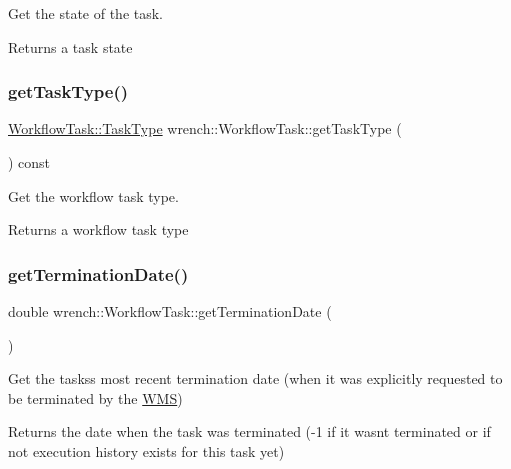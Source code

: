 Get the state of the task. 

\begin{DoxyReturn}{Returns}
a task state 
\end{DoxyReturn}
\mbox{\label{classwrench_1_1_workflow_task_ac9ad03bc492dd9a827c43e13e079e08c}} 
\subsubsection{\texorpdfstring{get\+Task\+Type()}{getTaskType()}}
{\footnotesize\ttfamily \hyperlink{classwrench_1_1_workflow_task_a490a935259b9425a3e4fb011a86cb4bf}{Workflow\+Task\+::\+Task\+Type} wrench\+::\+Workflow\+Task\+::get\+Task\+Type (\begin{DoxyParamCaption}{ }\end{DoxyParamCaption}) const}



Get the workflow task type. 

\begin{DoxyReturn}{Returns}
a workflow task type 
\end{DoxyReturn}
\mbox{\label{classwrench_1_1_workflow_task_a864c86e8bb6de6ab16106169ec0a2cc2}} 
\subsubsection{\texorpdfstring{get\+Termination\+Date()}{getTerminationDate()}}
{\footnotesize\ttfamily double wrench\+::\+Workflow\+Task\+::get\+Termination\+Date (\begin{DoxyParamCaption}{ }\end{DoxyParamCaption})}



Get the tasks\textquotesingle{}s most recent termination date (when it was explicitly requested to be terminated by the \hyperlink{classwrench_1_1_w_m_s}{W\+MS}) 

\begin{DoxyReturn}{Returns}
the date when the task was terminated (-\/1 if it wasn\textquotesingle{}t terminated or if not execution history exists for this task yet) 
\end{DoxyReturn}
\mbox{\label{classwrench_1_1_workflow_task_a07fd9a09e51649fe32aedd22166b1047}} 
